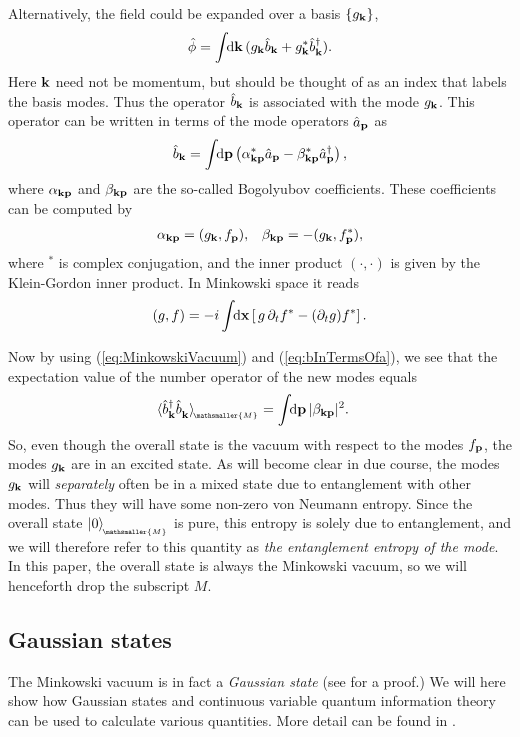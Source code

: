\documentclass[11pt, a4paper]{article}
\def\bx{{\bf x}}
\def\bk{{\bf k}}
\def\bp{{\bf p}}
\newcommand{\be}{\beta}
\newcommand{\al}{\alpha}
\newcommand{\del}{{\partial}}
\newcommand{\integral}{\int\!\! \mathrm{d}}
\newcommand{\ket}[1]{\left| #1 \right>} %
\newcommand{\ms}{\mathsmaller}
\newcommand{\nodagger}{{\phantom{\dagger}}}
\newcommand{\mink}{{\,_{\!\!\ms{M}}}}
\begin{document}
Alternatively, the field could be expanded over a basis $\{g_\bk\}$,
\begin{align*}
	\hat \phi=\integral \bk\,(g_\bk \hat b_\bk+g_\bk^* \hat b_\bk^\dagger).
\end{align*}
Here $\bk$ need not be momentum, but should be thought of as an index that labels the basis modes. Thus the operator $\hat b_\bk$ is associated with the mode $g_\bk$. This operator can be written in terms of the mode operators $\hat a_\bp$ as 
\begin{align}
\label{eq:bInTermsOfa}
\hat b_\bk= \integral \bp \left(\al_{\bk\bp}^* \hat a_\bp-\be_{\bk\bp}^*\hat a_{\bp}^\dagger\right),
\end{align}
where $\al_{\bk\bp}$ and $\be_{\bk\bp}$  are the so-called Bogolyubov coefficients. These coefficients can be computed by
\begin{align}
\label{eq:alphaBeta}
\al_{\bk\bp}=(g_{\bk},f_{\bp}),
&&
\be_{\bk\bp}=-(g_{\bk},f_{\bp}^*),
\end{align} 
where ${}^*$ is complex conjugation, and the inner product $(\cdot,\cdot)$ is given by the Klein-Gordon inner product. In Minkowski space it reads 
\begin{align}
\label{eq:KleinGordonInnerProduct}
(g,f)=-i \integral\bx \left[\,g\,\del_t f^*-(\del_t g)f^*\right].
\end{align}

Now by using (\ref{eq:MinkowskiVacuum}) and (\ref{eq:bInTermsOfa}), we see that the expectation value of the number operator of the new modes equals
\begin{align}
\label{eq:particlesInTheVacuum}\langle \hat b_\bk^\dagger \hat b^\nodagger_\bk \rangle_\mink &=\integral \bp\,|\be_{\bk\bp}|^2.
\end{align}
So, even though the overall state is the vacuum with respect to the modes $f_\bp$, the modes $g_\bk$ are in an excited state. As will become clear in due course, the modes $g_\bk$ will \emph{separately} often be in a mixed state due to entanglement with other modes. Thus they will have some non-zero von Neumann entropy. Since the overall state $\ket{0}_\mink$ is pure, this entropy is solely due to entanglement, and we will therefore refer to this quantity as \emph{the entanglement entropy of the mode}. In this paper, the overall state is always the Minkowski vacuum, so we will henceforth drop the subscript $M$. 

\subsection{Gaussian states}\label{sec:GaussianStates}
The Minkowski vacuum is in fact a \emph{Gaussian state} (see 
\cite{Wang, Kattemolle} for a proof.) We will here show how Gaussian states and continuous variable quantum information theory can be used to calculate various quantities. More detail can be found in \cite{Ferraro, Adesso, Demarie, Wang}. 
\end{document}
